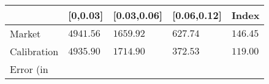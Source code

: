 \begin{tabular}{lllll}
& [0,0.03] & [0.03,0.06] & [0.06,0.12] & Index \\ 
\toprule 
Market & $ 4941.56 $ & $ 1659.92 $ & $ 627.74 $ & $ 146.45 $ \\ 
Calibration & $ 4935.90 $ & $ 1714.90 $ & $ 372.53 $ & $ 119.00 $ \\ 
Error (in %
\end{tabular}